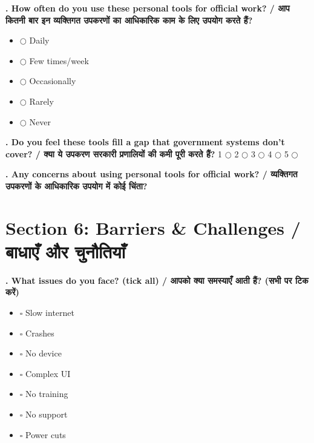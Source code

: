 \documentclass[11pt,a4paper]{article}
\newcounter{qcounter}
\begin{document}
\textbf{. How often do you use these personal tools for official work? / आप कितनी बार इन व्यक्तिगत उपकरणों का आधिकारिक काम के लिए उपयोग करते हैं?}
\vspace{0.1cm}
\begin{itemize}[label=, itemsep=0.1cm, leftmargin=0.5cm]
    \item $\bigcirc$ Daily
    \item $\bigcirc$ Few times/week
    \item $\bigcirc$ Occasionally
    \item $\bigcirc$ Rarely
    \item $\bigcirc$ Never
\end{itemize}
\vspace{0.2cm}

\textbf{. Do you feel these tools fill a gap that government systems don't cover? / क्या ये उपकरण सरकारी प्रणालियों की कमी पूरी करते हैं?}
\vspace{0.1cm}
\vspace{0.1cm}
1 $\bigcirc$ \hspace{1cm} 2 $\bigcirc$ \hspace{1cm} 3 $\bigcirc$ \hspace{1cm} 4 $\bigcirc$ \hspace{1cm} 5 $\bigcirc$
\vspace{0.4cm}

\textbf{. Any concerns about using personal tools for official work? / व्यक्तिगत उपकरणों के आधिकारिक उपयोग में कोई चिंता?}
\vspace{0.1cm}
\vspace{0.2cm}
\hrulefill\par\vspace{0.6cm}\hrulefill\par\vspace{0.6cm}\hrulefill
\vspace{0.4cm}


\section*{Section 6: Barriers & Challenges / बाधाएँ और चुनौतियाँ}
\vspace{0.2cm}
\textbf{. What issues do you face? (tick all) / आपको क्या समस्याएँ आती हैं? (सभी पर टिक करें)}
\vspace{0.1cm}
\begin{itemize}[label=, itemsep=0.1cm, leftmargin=0.5cm]
    \item $\square$ Slow internet
    \item $\square$ Crashes
    \item $\square$ No device
    \item $\square$ Complex UI
    \item $\square$ No training
    \item $\square$ No support
    \item $\square$ Power cuts
\end{itemize}
\vspace{0.2cm}
\end{document}

